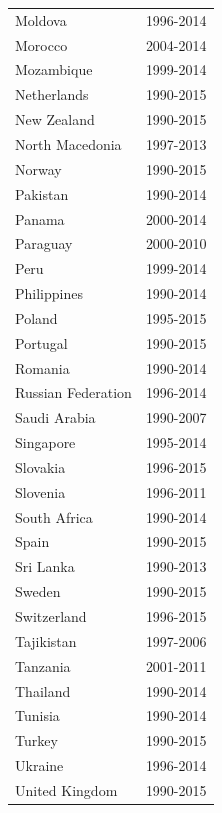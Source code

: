 \documentclass[12pt,a4paper]{article}
\begin{document}
\begin{table}[htbp]
\begin{subtable}{0.45\textwidth}
\begin{tabular}{ll}
                   Moldova &  1996-2014 \\
                   Morocco &  2004-2014 \\
                Mozambique &  1999-2014 \\
               Netherlands &  1990-2015 \\
               New Zealand &  1990-2015 \\
           North Macedonia &  1997-2013 \\
                    Norway &  1990-2015 \\
                  Pakistan &  1990-2014 \\
                    Panama &  2000-2014 \\
                  Paraguay &  2000-2010 \\
                      Peru &  1999-2014 \\
               Philippines &  1990-2014 \\
                    Poland &  1995-2015 \\
                  Portugal &  1990-2015 \\
                   Romania &  1990-2014 \\
        Russian Federation &  1996-2014 \\
              Saudi Arabia &  1990-2007 \\
                 Singapore &  1995-2014 \\
                  Slovakia &  1996-2015 \\
                  Slovenia &  1996-2011 \\
              South Africa &  1990-2014 \\
                     Spain &  1990-2015 \\
                 Sri Lanka &  1990-2013 \\
                    Sweden &  1990-2015 \\
               Switzerland &  1996-2015 \\
                Tajikistan &  1997-2006 \\
                  Tanzania &  2001-2011 \\
                  Thailand &  1990-2014 \\
                   Tunisia &  1990-2014 \\
                    Turkey &  1990-2015 \\
                   Ukraine &  1996-2014 \\
            United Kingdom &  1990-2015 \\

\end{tabular}
\end{subtable}
\end{table}
\end{document}
